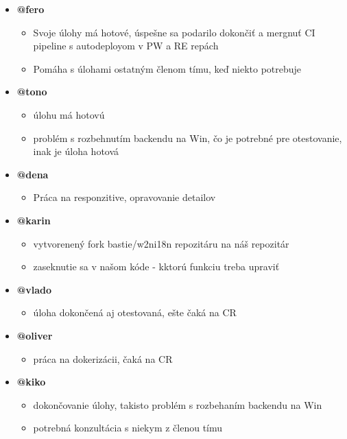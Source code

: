 \documentclass{article}
\begin{document}
    \begin{itemize}
        \item \textbf {@fero}
        \begin{itemize}
            \item Svoje úlohy má hotové, úspešne sa podarilo dokončiť a mergnuť CI pipeline s autodeployom v PW a RE repách
            \item Pomáha s úlohami ostatným členom tímu, keď niekto potrebuje
        \end{itemize}
        \item \textbf {@tono}
        \begin{itemize}
            \item úlohu má hotovú
            \item problém s rozbehnutím backendu na Win, čo je potrebné pre otestovanie, inak je úloha hotová
        \end{itemize}
        \item \textbf {@dena}
        \begin{itemize}
            \item Práca na responzitive, opravovanie detailov
        \end{itemize}
        \item \textbf {@karin}
        \begin{itemize}
            \item vytvorenený fork bastie/w2ni18n repozitáru na náš repozitár 
            \item zaseknutie sa v našom kóde - kktorú funkciu treba upraviť
        \end{itemize}
        \item \textbf {@vlado}
        \begin{itemize}
            \item úloha dokončená aj otestovaná, ešte čaká na CR
        \end{itemize}
        \item \textbf {@oliver}
        \begin{itemize}
            \item práca na dokerizácii, čaká na CR
        \end{itemize}
        \item \textbf {@kiko}
        \begin{itemize}
            \item dokončovanie úlohy, takisto problém s rozbehaním backendu na Win
            \item potrebná konzultácia s niekym z členou tímu
        \end{itemize}
    \end{itemize}    
\end{document}
